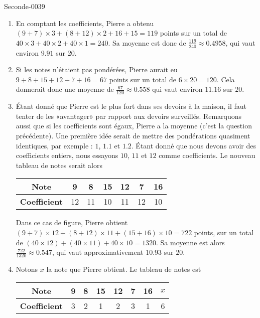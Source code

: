 
\begin{corrige}{Seconde-0039}

    \begin{enumerate}
        \item\label{ItemjTzFsb}
            En comptant les coefficients, Pierre a obtenu \( (9+7)\times 3+(8+12)\times 2+16+15=119\) points sur un total de \( 40\times 3+40\times 2+40\times 1=240\). Sa moyenne est donc de \( \frac{ 119 }{ 240 }\approx 0.4958\), qui vaut environ \( 9.91\) sur \( 20\).

        \item
            Si les notes n'étaient pas pondérées, Pierre aurait eu \( 9+8+15+12+7+16=67\) points sur un total de \( 6\times 20=120\). Cela donnerait donc une moyenne de \( \frac{ 67 }{ 120 }\approx 0.558\) qui vaut environ \( 11.16\) sur \( 20\).

        \item
            Étant donné que Pierre est le plus fort dans ses devoirs à la maison, il faut tenter de les «avantager» par rapport aux devoirs surveillés. Remarquons aussi que si les coefficients sont égaux, Pierre a la moyenne (c'est la question précédente). Une première idée serait de mettre des pondérations quasiment identiques, par exemple : \( 1\), \( 1.1\) et \( 1.2\). Étant donné que nous devons avoir des coefficients entiers, nous essayons \( 10\), \( 11\) et \( 12\) comme coefficients. Le nouveau tableau de notes serait alors

\begin{center}
  \begin{tabular}{|c||c|c|c|c|c|c|}
      \hline
    \textbf{Note} & 9 & 8 & 15 & 12 & 7 & 16  \\
    \hline
    \textbf{Coefficient} & 12 & 11 & 10 & 11 & 12 & 10 \\
    \hline
  \end{tabular}      
\end{center}

    Dans ce cas de figure, Pierre obtient \( (9+7)\times 12+(8+12)\times 11+(15+16)\times 10=722\) points, sur un total de \( (40\times 12)+(40\times 11)+40\times 10=1320\). Sa moyenne est alors \( \frac{ 722 }{ 1320 }\approx 0.547\), qui vaut approximativement \( 10.93\) sur \( 20\).

    \item
        Notons \( x\) la note que Pierre obtient. Le tableau de notes est 
\begin{center}
  \begin{tabular}{|c||c|c|c|c|c|c|c|}
      \hline
    \textbf{Note} & 9 & 8 & 15 & 12 & 7 & 16    & \( x\)  \\
    \hline
    \textbf{Coefficient} & 3 & 2 & 1 & 2 & 3 & 1 & 6 \\
    \hline
  \end{tabular}      
\end{center}


\end{enumerate}
\end{corrige}
